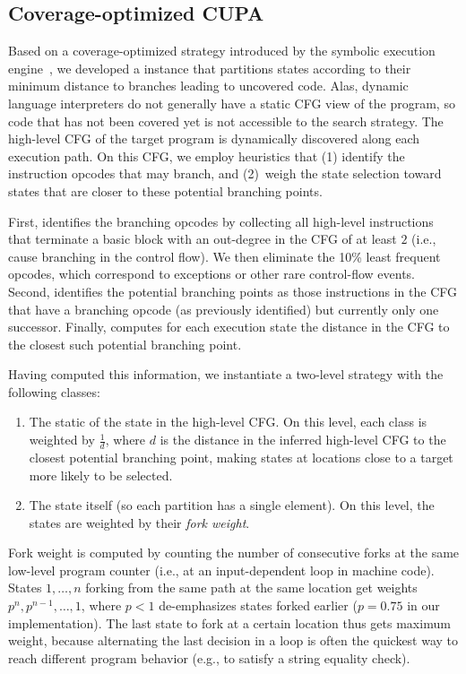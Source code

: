 \subsection{Coverage-optimized CUPA}
\label{sec:chef:cupa-coverage}

Based on a coverage-optimized strategy introduced by the \klee symbolic execution engine~\cite{klee}, we developed a \cupa instance that partitions states according to their minimum distance to branches leading to uncovered code.
%
Alas, dynamic language interpreters do not generally have a static CFG view of the program, so code that has not been covered yet is not accessible to the search strategy.  The high-level CFG of the target program is dynamically discovered along each execution path.  On this CFG, we employ heuristics that (1) identify the instruction opcodes that may branch, and (2)~weigh the state selection toward states that are closer to these potential branching points.

First, \chef identifies the branching opcodes by collecting all high-level instructions that terminate a basic block with an out-degree in the CFG of at least $2$ (i.e., cause branching in the control flow).   We then eliminate the 10\% least frequent opcodes, which correspond to exceptions or other rare control-flow events.
%
Second, \chef identifies the potential branching points as those instructions in the CFG that have a branching opcode (as previously identified) but currently only one successor.
%
Finally, \chef computes for each execution state the distance in the CFG to the closest such potential branching point.

Having computed this information, we instantiate a two-level \cupa strategy with the following classes:
\begin{enumerate}
\item The static \hlpc of the state in the high-level CFG.  On this level, each class is weighted by $\frac{1}{d}$, where $d$ is the distance in the inferred high-level CFG to the closest potential branching point, making states at locations close to a target more likely to be selected.
\item The state itself (so each partition has a single element).  On this level, the states are weighted by their \textit{fork weight}.
\end{enumerate}

Fork weight is computed by counting the number of consecutive forks at the same low-level program counter (i.e., at an input-dependent loop in machine code).  States $1, \ldots, n$ forking from the same path at the same location get weights $p^n, p^{n-1}, \ldots, 1$, where $p < 1$ de-emphasizes states forked earlier ($p = 0.75$ in our implementation).  The last state to fork at a certain location thus gets maximum weight, because alternating the last decision in a loop is often the quickest way to reach different program behavior (e.g., to satisfy a string equality check).

